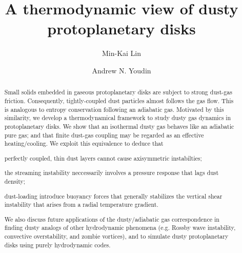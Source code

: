 \documentclass[iop, numberedappendix]{emulateapj}
\begin{document}
\title{A thermodynamic view of dusty protoplanetary disks}
\author{Min-Kai Lin}
\author{Andrew N. Youdin}

\begin{abstract}
  Small solids embedded in gaseous protoplanetary disks are subject
  to strong dust-gas friction. Consequently, tightly-coupled dust
  particles almost follows the gas flow. 
  This is analogous to entropy conservation
  following an adiabatic gas.  
  Motivated by this similarity, we develop a thermodynamical
  framework to study dusty gas dynamics in protoplanetary disks. We  
 show that an isothermal dusty gas behaves like an  
  adiabatic pure gas; and that finite dust-gas coupling may be
  regarded as an effective 
  heating/cooling. We exploit this equivalence 
  to deduce that   
\begin{inparaenum}[1)] 
\item 
 perfectly coupled, thin dust layers cannot cause axisymmetric 
 instabilties; 
\item 
  the streaming instability neccessarily involves a pressure response
  that lags dust density; 
\item dust-loading introduce buoyancy forces that generally 
  stabilizes the vertical shear 
  instability that arises from a radial temperature gradient. 
\end{inparaenum}  
We also discuss future applications of the dusty/adiabatic gas
correspondence in finding dusty analogs of other hydrodynamic
phenomena (e.g. Rossby wave instability, convective overstability, and 
zombie vortices), and to simulate dusty protoplanetary disks
using purely hydrodynamic codes. %

\end{abstract}
\end{document}
